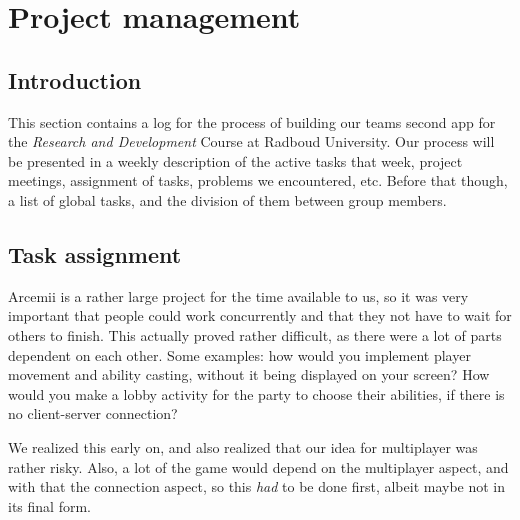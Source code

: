 \documentclass[../main.tex]{subfiles}
\begin{document}
\pagebreak
\section{Project management}
\subsection*{Introduction}
This section contains a log for the process of building our teams second app for the \textit{Research and Development} Course at Radboud University.
Our process will be presented in a weekly description of the active tasks that week, project meetings, assignment of tasks, problems we encountered, etc. Before that though, a list of global tasks, and the division of them between group members.

\subsection*{Task assignment}
Arcemii is a rather large project for the time available to us, so it was very important that people could work concurrently and that they not have to wait for others to finish. This actually proved rather difficult, as there were a lot of parts dependent on each other. Some examples: how would you implement player movement and ability casting, without it being displayed on your screen? How would you make a lobby activity for the party to choose their abilities, if there is no client-server connection?

We realized this early on, and also realized that our idea for multiplayer was rather risky. Also, a lot of the game would depend on the multiplayer aspect, and with that the connection aspect, so this \textit{had} to be done first, albeit maybe not in its final form.
\end{document}
